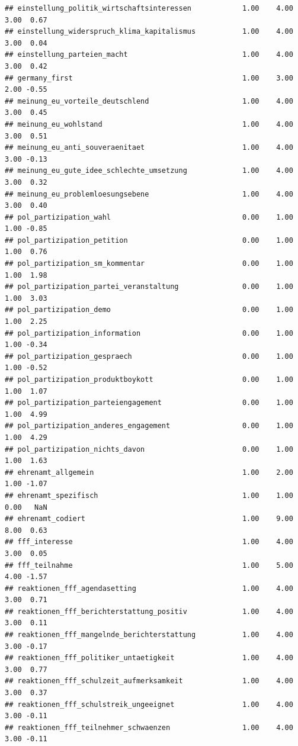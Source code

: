 \documentclass[
]{book}
\begin{document}
\begin{verbatim}
## einstellung_politik_wirtschaftsinteressen            1.00    4.00    3.00  0.67
## einstellung_widerspruch_klima_kapitalismus           1.00    4.00    3.00  0.04
## einstellung_parteien_macht                           1.00    4.00    3.00  0.42
## germany_first                                        1.00    3.00    2.00 -0.55
## meinung_eu_vorteile_deutschlend                      1.00    4.00    3.00  0.45
## meinung_eu_wohlstand                                 1.00    4.00    3.00  0.51
## meinung_eu_anti_souveraenitaet                       1.00    4.00    3.00 -0.13
## meinung_eu_gute_idee_schlechte_umsetzung             1.00    4.00    3.00  0.32
## meinung_eu_problemloesungsebene                      1.00    4.00    3.00  0.40
## pol_partizipation_wahl                               0.00    1.00    1.00 -0.85
## pol_partizipation_petition                           0.00    1.00    1.00  0.76
## pol_partizipation_sm_kommentar                       0.00    1.00    1.00  1.98
## pol_partizipation_partei_veranstaltung               0.00    1.00    1.00  3.03
## pol_partizipation_demo                               0.00    1.00    1.00  2.25
## pol_partizipation_information                        0.00    1.00    1.00 -0.34
## pol_partizipation_gespraech                          0.00    1.00    1.00 -0.52
## pol_partizipation_produktboykott                     0.00    1.00    1.00  1.07
## pol_partizipation_parteiengagement                   0.00    1.00    1.00  4.99
## pol_partizipation_anderes_engagement                 0.00    1.00    1.00  4.29
## pol_partizipation_nichts_davon                       0.00    1.00    1.00  1.63
## ehrenamt_allgemein                                   1.00    2.00    1.00 -1.07
## ehrenamt_spezifisch                                  1.00    1.00    0.00   NaN
## ehrenamt_codiert                                     1.00    9.00    8.00  0.63
## fff_interesse                                        1.00    4.00    3.00  0.05
## fff_teilnahme                                        1.00    5.00    4.00 -1.57
## reaktionen_fff_agendasetting                         1.00    4.00    3.00  0.71
## reaktionen_fff_berichterstattung_positiv             1.00    4.00    3.00  0.11
## reaktionen_fff_mangelnde_berichterstattung           1.00    4.00    3.00 -0.17
## reaktionen_fff_politiker_untaetigkeit                1.00    4.00    3.00  0.77
## reaktionen_fff_schulzeit_aufmerksamkeit              1.00    4.00    3.00  0.37
## reaktionen_fff_schulstreik_ungeeignet                1.00    4.00    3.00 -0.11
## reaktionen_fff_teilnehmer_schwaenzen                 1.00    4.00    3.00 -0.11

\end{verbatim}
\end{document}
